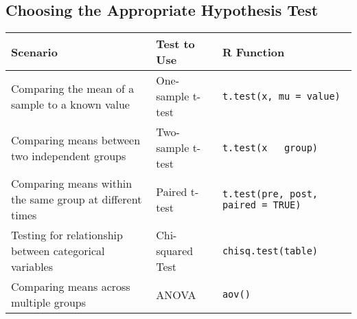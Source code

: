 \subsection{Choosing the Appropriate Hypothesis Test}

\begin{tabularx}{\textwidth}{|p{9cm}|X|X|}
\hline
\textbf{Scenario} & \textbf{Test to Use} & \textbf{R Function} \\
\hline
Comparing the mean of a sample to a known value & One-sample t-test & \texttt{t.test(x, mu = value)} \\
\hline
Comparing means between two independent groups & Two-sample t-test & \texttt{t.test(x ~ group)} \\
\hline
Comparing means within the same group at different times & Paired t-test & \texttt{t.test(pre, post, paired = TRUE)} \\
\hline
Testing for relationship between categorical variables & Chi-squared Test & \texttt{chisq.test(table)} \\
\hline
Comparing means across multiple groups & ANOVA & \texttt{aov()} \\
\hline
\end{tabularx}


